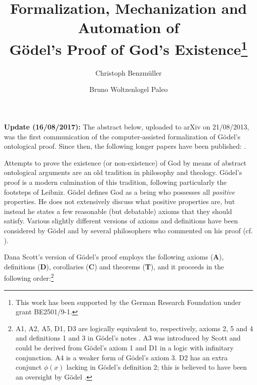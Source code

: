 \documentclass{llncs}
\title{Formalization, Mechanization and Automation %
  of \\ G\"{o}del's Proof of God's Existence\thanks{This work has been
    supported by the German Research Foundation under grant
    BE2501/9-1.}}
\author{
  Christoph Benzm\"{u}ller\inst{1} 
  \and 
  Bruno Woltzenlogel Paleo\inst{2}
}
\institute{
  Dahlem Center for Intelligent Systems, Freie Universit\"{a}t Berlin, Germany\\
  \email{c.benzmueller@gmail.com}
  \and 
  Theory and Logic Group, Vienna University of Technology, Austria \\
  \email{bruno@logic.at}
}
\begin{document}
\maketitle

\bigskip

\noindent
\textbf{Update (16/08/2017):} The abstract below, uploaded to arXiv on 21/08/2013, was the first communication of the computer-assisted formalization of G\"odel's ontological proof. Since then, the following longer papers have been published: \cite{B39,B40,B45,B47,B49,B52,B56,B57,B60,B61,B62,B63,B64,B65,B66}.

\bigskip
\bigskip

Attempts to prove the existence (or non-existence) of God by means of
abstract ontological arguments are an old tradition in philosophy and
theology.  G\"{o}del's proof \cite{Goedel1970,GoedelNotes} is a modern culmination of
this tradition, following particularly the footsteps of Leibniz.
%
G\"{o}del defines God as a being who possesses all \emph{positive} properties.
He does not extensively discuss what positive properties are, 
but instead he states a few reasonable (but debatable) axioms that they should satisfy.
Various slightly different versions of axioms and definitions have
been considered by G\"{o}del and by several philosophers who commented
on his proof
(cf. \cite{sobel2004logic,AndersonGettings,Fitting,Adams,ContemporaryBibliography}). 

Dana Scott's version of G\"odel's proof \cite{ScottNotes} employs the
following axioms (\textbf{A}), definitions (\textbf{D}), corollaries
(\textbf{C}) and theorems (\textbf{T}), and it proceeds in the
following order:\footnote{ A1, A2, A5, D1, D3 are logically
  equivalent to, respectively, axioms 2, 5 and 4 and definitions 1 and
  3 in G\"odel's notes \cite{Goedel1970,GoedelNotes}. 
  A3 was introduced by Scott \cite{ScottNotes} and 
  could be derived from G\"odel's axiom 1 and
  D1 in a logic with infinitary conjunction. 
  A4 is a weaker form of G\"odel's axiom 3. 
  D2 has an extra conjunct $\phi(x)$ lacking in G\"odel's definition 2; 
  this is believed to have been 
  an oversight by G\"odel \cite{Hazen}.}
\end{document}
